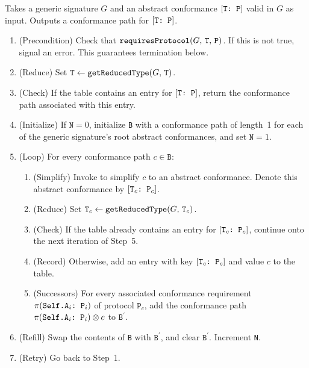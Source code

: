 \documentclass[../generics]{subfiles}
\begin{document}
\begin{algorithm}\label{find conformance path algorithm}
Takes a generic signature $G$ and an abstract conformance $[\texttt{T:~P}]$ valid in $G$ as input. Outputs a conformance path for $[\texttt{T:~P}]$.

\begin{enumerate}
\item (Precondition) Check that $\texttt{requiresProtocol}(G,\,\texttt{T},\,\texttt{P})$. If this is not true, signal an error. This guarantees termination below.

\item (Reduce) Set $\texttt{T}\leftarrow\texttt{getReducedType}(G,\,\texttt{T})$.

\item (Check) If the table contains an entry for $[\texttt{T:~P}]$, return the conformance path associated with this entry.

\item (Initialize) If $\texttt{N}=0$, initialize \texttt{B} with a conformance path of length~1 for each of the generic signature's root abstract conformances, and set $\texttt{N}=1$.

\item (Loop) For every conformance path $c\in \texttt{B}$:

\begin{enumerate}

\item (Simplify) Invoke  to simplify $c$ to an abstract conformance. Denote this abstract conformance by $[\texttt{$\texttt{T}_c$:~$\texttt{P}_c$}]$.

\item (Reduce) Set $\texttt{T}_c\leftarrow\texttt{getReducedType}(G,\,\texttt{T}_c)$.

\item (Check) If the table already contains an entry for $[\texttt{$\texttt{T}_c$:~$\texttt{P}_c$}]$, continue onto the next iteration of Step~5.

\item (Record) Otherwise, add an entry with key $[\texttt{$\texttt{T}_c$:~$\texttt{P}_c$}]$ and value $c$ to the table.

\item (Successors) For every associated conformance requirement $\pi(\texttt{Self.$\texttt{A}_i$:~$\texttt{P}_i$})$ of protocol $\texttt{P}_c$, add the conformance path $\pi(\texttt{Self.$\texttt{A}_i$:~$\texttt{P}_i$})\otimes c$ to $\texttt{B}^\prime$.
\end{enumerate}

\item (Refill) Swap the contents of \texttt{B} with $\texttt{B}^\prime$, and clear $\texttt{B}^\prime$. Increment \texttt{N}.

\item (Retry) Go back to Step~1.
\end{enumerate}
\end{algorithm}
\end{document}
